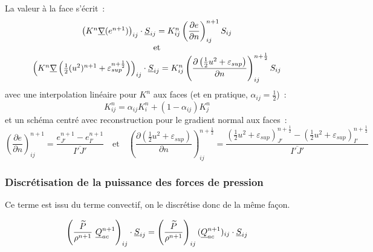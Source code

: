 La valeur à la face s'écrit~:
\begin{equation}
\begin{array}{c}
\left(K^n\underline{\nabla}(e^{n+1})\right)_{ij}\cdot\underline{S}_{ij}
= K_{ij}^n
\displaystyle \left( \frac{\partial e}{\partial n} \right)^{n+1}_{ij}S_{ij}\\
\text{et}\\
\left(K^n \underline{\nabla}\left(\frac{1}{2}(u^2)^{n+1}
+ \varepsilon_{sup}^{n+\frac{1}{2}}\right)\right)_{ij}\cdot\underline{S}_{ij}
= K_{ij}^n
\displaystyle \left( \frac{\partial \left(\frac{1}{2} u^2
+ \varepsilon_{sup}\right)}{\partial n} \right)^{n+\frac{1}{2}}_{ij}S_{ij}
\end{array}
\end{equation}
avec une interpolation linéaire pour
$K^n$ aux faces (et en pratique, $\alpha_{ij}=\frac{1}{2}$)~:
\begin{equation}
K_{ij}^n
= \alpha_{ij}K_{i}^n+(1-\alpha_{ij})K_{j}^n
\end{equation}
et un schéma centré avec reconstruction pour le gradient normal aux faces~:
\begin{equation}
\displaystyle \left( \frac{\partial e}{\partial n} \right)^{n+1}_{ij}
= \displaystyle\frac{e_{J'}^{n+1} - e_{I'}^{n+1}}{\overline{I'J'}}
\quad \text{et} \quad
\displaystyle \left( \frac{\partial \left(\frac{1}{2} u^2
+ \varepsilon_{sup}\right)}{\partial n} \right)^{n+\frac{1}{2}}_{ij}
= \displaystyle\frac{(\frac{1}{2} u^2
+ \varepsilon_{sup})_{J'}^{n+\frac{1}{2}} - (\frac{1}{2} u^2
+ \varepsilon_{sup})_{I'}^{n+\frac{1}{2}}}{\overline{I'J'}}
\end{equation}



\subsubsection*{Discrétisation de la puissance des forces de pression}

Ce terme
est issu du terme convectif, on le discrétise donc de la même façon.

\begin{equation}
\left(\displaystyle\frac{\widetilde{P}}{\rho^{n+1}}\
\underline{Q}_{ac}^{n+1}\right)_{ij} \cdot \underline{S}_{ij}
= \left(\displaystyle\frac{\widetilde{P}}{\rho^{n+1}}\right)_{ij}
(\underline{Q}_{ac}^{n+1})_{ij} \cdot \underline{S}_{ij}
\end{equation}


